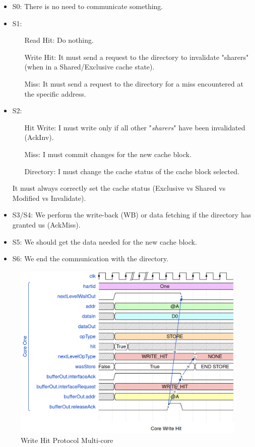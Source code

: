 \documentclass[10pt,letterpaper]{article}
\begin{document}
\begin{itemize}
    \item S0: There is no need to communicate something.
     \item S1: 
     \begin{itemize}
         \item [Read Hit:] Do nothing.
         \item [Write Hit:] It must send a request to the directory to invalidate "sharers" (when in a Shared/Exclusive cache state).
         \item [Miss:] It must send a request to the directory for a miss encountered at the specific address.
     \end{itemize}
    \item S2: 
    \begin{itemize}
        \item [Hit Write:] I must write only if all other "\textit{sharers}" have been invalidated (AckInv).
        \item [Miss:] I must commit changes for the new cache block.
        \item [Directory:] I must change the cache status of the cache block selected.
    \end{itemize}
    It must always correctly set the cache status (Exclusive vs Shared vs Modified vs Invalidate).
    \item S3/S4: We perform the write-back (WB) or data fetching if the directory has granted us (AckMiss).
    \item S5: We should get the data needed for the new cache block.
    \item S6: We end the communication with the directory.
\end{itemize}

\begin{figure}[H]
\centering
\includegraphics[width=12cm]{img/multi_proc/hit_wave.png}
\caption{Write Hit Protocol Multi-core}
\label{fig:wh_multicore}
\end{figure}
\end{document}
